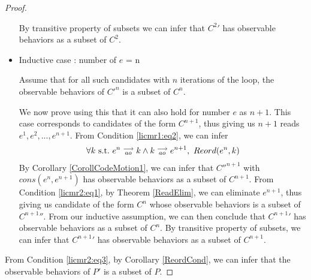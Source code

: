 \begin{proof}
\begin{itemize}
        By transitive property of subsets we can infer that $C^2'$ has observable behaviors as a subset of $C^2$.
        
        \item Inductive case : number of $e$ = n

        Assume that for all such candidates with $n$ iterations of the loop, the observable behaviors of $C'^n$ is a subset of $C^n$.

        We now prove using this that it can also hold for number $e$ as $n + 1$. 
        This case corresponds to candidates of the form $C^{n+1}$, thus giving us $n+1$ reads $e^1, e^2,...,e^{n+1}$.
        From Condition \ref{licmr1:eq2}, we can infer
        \begin{align*}
            \forall k \ \text{s.t.} \ e^n\stackrel{\longrightarrow}{_{ao}}k \wedge k\stackrel{\longrightarrow}{_{ao}}e^{n+1}, \ Reord(e^{n}, k)
        \end{align*}
        By Corollary \ref{CorollCodeMotion1}, we can infer that $C''^{n+1}$ with $cons(e^n, e^{n+1})$ has observable behaviors as a subset of $C^{n+1}$. 
        From Condition \ref{licmr2:eq1}, by Theorem \ref{ReadElim}, we can eliminate $e^{n+1}$, thus giving us candidate of the form $C^n$ whose observable behaviors is a subset of $C^{n+1}''$.
        From our inductive assumption, we can then conclude that $C^{n+1}'$ has observable behaviors as a subset of $C^n$. 
        By transitive property of subsets, we can infer that $C^{n+1}'$ has observable behaviors as a subset of $C^{n+1}$.

    \end{itemize}

    From Condition \ref{licmr2:eq3}, by Corollary \ref{ReordCond}, we can infer that the observable behaviors of $P'$ is a subset of $P$.
    
\end{proof}